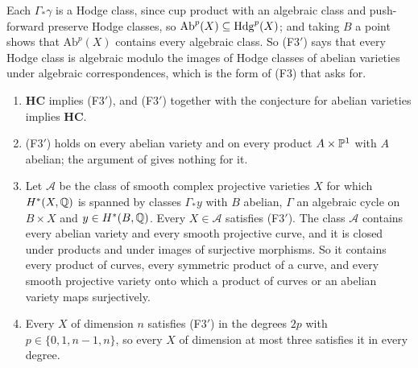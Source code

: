 Each $\Gamma_{*}\gamma$ is a Hodge class, since cup product with an
algebraic class and push-forward preserve Hodge classes, so
$\mathrm{Ab}^{p}(X)\subseteq\mathrm{Hdg}^{p}(X)$; and taking $B$ a point shows that
$\mathrm{Ab}^{p}(X)$ contains every algebraic class. So \textup{(F3$'$)} says
that every Hodge class is algebraic modulo the images of Hodge classes of
abelian varieties under algebraic correspondences, which is the form of (F3)
that  asks for.

\begin{proposition}\label{prop:f3prime}
\leavevmode
\begin{enumerate}[label=\textup{(\roman*)},leftmargin=2.6em]
\item $\mathbf{HC}$ implies \textup{(F3$'$)}, and \textup{(F3$'$)} together
  with the conjecture for abelian varieties implies $\mathbf{HC}$.
\item \textup{(F3$'$)} holds on every abelian variety and on every product
  $A\times\mathbb{P}^{1}$ with $A$ abelian; the argument of  gives
  nothing for it.
\item Let $\mathcal{A}$ be the class of smooth complex projective varieties
  $X$ for which $H^{*}(X,\mathbb{Q})$ is spanned by classes $\Gamma_{*}y$ with $B$
  abelian, $\Gamma$ an algebraic cycle on $B\times X$ and
  $y\in H^{*}(B,\mathbb{Q})$. Every $X\in\mathcal{A}$ satisfies \textup{(F3$'$)}.
  The class $\mathcal{A}$ contains every abelian variety and every smooth
  projective curve, and it is closed under products and under images of
  surjective morphisms. So it contains every product of curves, every
  symmetric product of a curve, and every smooth projective variety onto
  which a product of curves or an abelian variety maps surjectively.
\item Every $X$ of dimension $n$ satisfies \textup{(F3$'$)} in the degrees
  $2p$ with $p\in\{0,1,n-1,n\}$, so every $X$ of dimension at most three
  satisfies it in every degree.
\end{enumerate}
\end{proposition}


